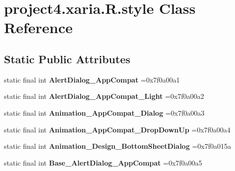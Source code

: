 \hypertarget{classproject4_1_1xaria_1_1R_1_1style}{}\section{project4.\+xaria.\+R.\+style Class Reference}
\label{classproject4_1_1xaria_1_1R_1_1style}
\subsection*{Static Public Attributes}
\begin{DoxyCompactItemize}
\item 
\mbox{\label{classproject4_1_1xaria_1_1R_1_1style_afddae013f9edb0cc6bb19ccb146a7bc5}} 
static final int {\bfseries Alert\+Dialog\+\_\+\+App\+Compat} =0x7f0a00a1
\item 
\mbox{\label{classproject4_1_1xaria_1_1R_1_1style_a521f0c5046953e33a86a888116bc6f39}} 
static final int {\bfseries Alert\+Dialog\+\_\+\+App\+Compat\+\_\+\+Light} =0x7f0a00a2
\item 
\mbox{\label{classproject4_1_1xaria_1_1R_1_1style_a01b94b565e6d9142f295fb4a8b955054}} 
static final int {\bfseries Animation\+\_\+\+App\+Compat\+\_\+\+Dialog} =0x7f0a00a3
\item 
\mbox{\label{classproject4_1_1xaria_1_1R_1_1style_ade26eaa2e248617a40b5553b8bb247cc}} 
static final int {\bfseries Animation\+\_\+\+App\+Compat\+\_\+\+Drop\+Down\+Up} =0x7f0a00a4
\item 
\mbox{\label{classproject4_1_1xaria_1_1R_1_1style_abb259a8555a051a4ed2b55da1e133928}} 
static final int {\bfseries Animation\+\_\+\+Design\+\_\+\+Bottom\+Sheet\+Dialog} =0x7f0a015a
\item 
\mbox{\label{classproject4_1_1xaria_1_1R_1_1style_a95b6ff00d145f1923693d50641080cbd}} 
static final int {\bfseries Base\+\_\+\+Alert\+Dialog\+\_\+\+App\+Compat} =0x7f0a00a5
\item 
\mbox{\label{classproject4_1_1xaria_1_1R_1_1style_a18b7b638bcd04157da4712e64482953d}} 

\end{DoxyCompactItemize}
